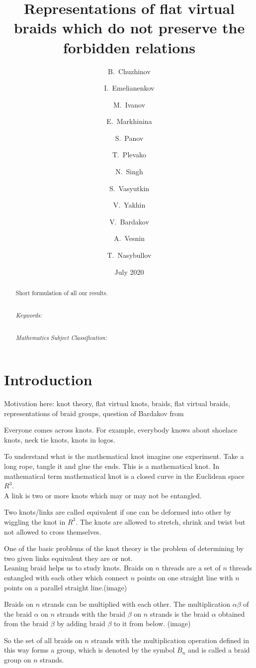 \documentclass{article}
\title{Representations of flat virtual braids which do not preserve the forbidden relations}
\author{B.~Chuzhinov \and I.~Emelianenkov \and  M.~Ivanov \and E.~Markhinina  \and S.~Panov \and  T.~Plevako \and N.~Singh \and S.~Vasyutkin \and V.~Yakhin \and V.~Bardakov \and A.~Vesnin \and T.~Nasybullov}
\date{July 2020}
\begin{document}
\maketitle
\begin{abstract}
 Short formulation of all our results.
 
 
 ~\\
 \textit{Keywords:}
 
 ~\\
 \textit{Mathematics Subject Classification:} 
\end{abstract}

\section{Introduction}
Motivation here: knot theory, flat virtual knots, braids, flat virtual braids, representations of braid groups, question of Bardakov from \cite{problems}

Everyone comes across knots. For example, everybody knows about shoelace knots, neck tie knots, knots in logos. 

To understand what is the mathematical knot imagine one experiment. Take a long rope, tangle it and glue the ends. This is a mathematical knot. In mathematical term mathematical knot is  a closed curve in the Euclidean space $R^3$. \\

A link is two or more knots which may or may not be entangled.

Two knots/links are called equivalent if one can be deformed into other by wiggling the knot in $R^3$. The knots are allowed to stretch, shrink and twist but not allowed to cross themselves.

One of the basic problems of the knot theory is the problem of determining by two given links equivalent they are or not.\\

Leaning braid helps us to study knots. Braids on $n$ threads are a set of  $n$ threads entangled with each other which connect $n$ points on one straight line with $n$ points on a parallel straight line.(image)

Braids on $n$ strands can be multiplied with each other. The multiplication $\alpha\beta$ of the braid $\alpha$ on $n$ strands with the braid $\beta$ on $n$ strands is the braid $\alpha$ obtained from the braid $\beta$  by adding braid $\beta$ to it from below. (image)

So the set of all braids on $n$ strands with the multiplication operation defined in this way forms a group, which is denoted by the symbol $B_n$ and is called a braid group on $n$ strands.
\end{document}
